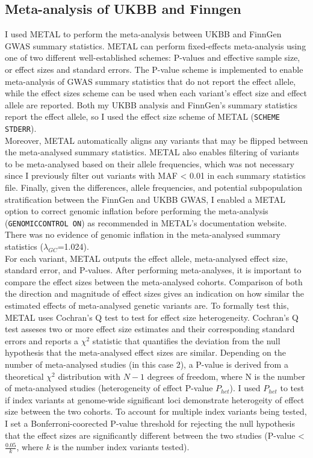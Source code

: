 \subsection{Meta-analysis of UKBB and Finngen}
I used METAL to perform the meta-analysis between UKBB and FinnGen GWAS summary statistics.  METAL can perform fixed-effects meta-analysis using one of two different well-established schemes: P-values and effective sample size, or effect sizes and standard errors. The P-value scheme is implemented to enable meta-analysis of GWAS summary statistics that do not report the effect allele, while the effect sizes scheme can be used when each variant's effect size and effect allele are reported. Both my UKBB analysis and FinnGen's summary statistics report the effect allele, so I used the effect size scheme of METAL (\Verb+SCHEME STDERR+). \\

Moreover, METAL automatically aligns any variants that may be flipped between the meta-analysed summary statistics. METAL also enables filtering of variants to be meta-analysed based on their allele frequencies, which was not necessary since I previously filter out variants with MAF < 0.01 in each summary statistics file. Finally, given the differences, allele frequencies, and potential subpopulation stratification between the FinnGen and UKBB GWAS, I enabled a METAL option to correct genomic inflation before performing the meta-analysis (\Verb+GENOMICCONTROL ON+) as recommended in METAL's documentation website. There was no evidence of genomic inflation in the meta-analysed summary statistics ($\lambda_{GC}$=1.024).\\

For each variant, METAL outputs the effect allele, meta-analysed effect size, standard error, and P-values. After performing meta-analyses, it is important to compare the effect sizes between the meta-analysed cohorts. Comparison of both the direction and magnitude of effect sizes gives an indication on how similar the estimated effects of meta-analysed genetic variants are. To formally test this, METAL uses Cochran's Q test to test for effect size heterogeneity. Cochran's Q test asseses two or more effect size estimates and their corresponding standard errors and reports a $\chi^{2}$ statistic that quantifies the deviation from the null hypothesis that the meta-analysed effect sizes are similar. Depending on the number of meta-analysed studies (in this case 2), a P-value is derived from a theoretical $\chi^{2}$ distribution with $N-1$ degrees of freedom, where N is the number of meta-analysed studies (heterogeneity of effect P-value $P_{het}$). I used $P_{het}$ to test if index variants at genome-wide significant loci demonstrate heterogeity of effect size between the two cohorts. To account for multiple index variants being tested, I set a Bonferroni-coorected P-value threshold for rejecting the null hypothesis that the effect sizes are significantly different between the two studies (P-value < $\frac{0.05}{k}$, where $k$ is the number index variants tested).


